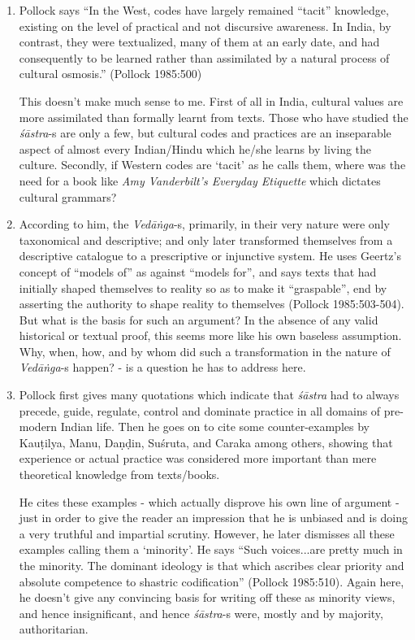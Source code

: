 \begin{enumerate}
\item Pollock says ``In the West, codes have largely remained ``tacit'' knowledge, existing on the level of practical and not discursive awareness. In India, by contrast, they were textualized, many of them at an early date, and had consequently to be learned rather than assimilated by a natural process of cultural osmosis.'' (Pollock 1985:500) 

This doesn't make much sense to me. First of all in India, cultural values are more assimilated than formally learnt from texts. Those who have studied the {\it śāstra}-s are only a few, but cultural codes and practices are an inseparable aspect of almost every Indian/Hindu which he/she learns by living the culture.  Secondly, if Western codes are `tacit' as he calls them, where was the need for a book like \textit{Amy Vanderbilt's Everyday Etiquette} which dictates cultural grammars?

\item According to him, the {\it Vedāṅga}-s, primarily, in their very nature were only taxonomical and descriptive; and only later transformed themselves from a descriptive catalogue to a prescriptive or injunctive system. He uses Geertz's concept of ``models of'' as against ``models for'', and says texts that had initially shaped themselves to reality so as to make it ``graspable'', end by asserting the authority to shape reality to themselves (Pollock 1985:503-504). But what is the basis for such an argument? In the absence of any valid historical or textual proof, this seems more like his own baseless assumption. Why, when, how, and by whom did such a transformation in the nature of {\it Vedāṅga}-s happen? - is a question he has to address here.

\item Pollock first gives many quotations which indicate that {\it śāstra} had to always precede, guide, regulate, control and dominate practice in all domains of pre-modern Indian life. Then he goes on to cite some counter-examples by Kauṭilya, Manu, Daṇḍin, Suśruta, and Caraka among others, showing that experience or actual practice was considered more important than mere theoretical knowledge from texts/books. 

He cites these examples - which actually disprove his own line of argument - just in order to give the reader an impression that he is unbiased and is doing a very truthful and impartial scrutiny. However, he later dismisses all these examples calling them a `minority'. He says ``Such voices...are pretty much in the minority. The dominant ideology is that which ascribes clear priority and absolute competence to shastric codification'' (Pollock 1985:510). Again here, he doesn't give any convincing basis for writing off these as minority views, and hence insignificant, and hence {\it śāstra}-s were, mostly and by majority, authoritarian. 
\end{enumerate}

